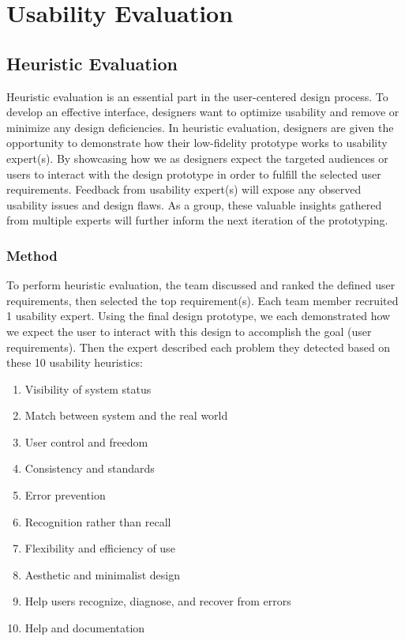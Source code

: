 \documentclass[acmsmall,screen,authorversion,nonacm]{acmart}
\begin{document}
\section{Usability Evaluation}

\subsection{Heuristic Evaluation}

Heuristic evaluation is an essential part in the user-centered design process. To develop an effective interface, designers want to optimize usability and remove or minimize any design deficiencies. In heuristic evaluation, designers are given the opportunity to demonstrate how their low-fidelity prototype works to usability expert(s). By showcasing how we as designers expect the targeted audiences or users to interact with the design prototype in order to fulfill the selected user requirements. Feedback from usability expert(s) will expose any observed usability issues and design flaws. As a group, these valuable insights gathered from multiple experts will further inform the next iteration of the prototyping. 

\subsubsection{Method}

To perform heuristic evaluation, the team discussed and ranked the defined user requirements, then selected the top requirement(s). Each team member recruited 1 usability expert. Using the final design prototype, we each demonstrated how we expect the user to interact with this design to accomplish the goal (user requirements). Then the expert described each problem they detected based on these 10 usability heuristics: 

\begin{enumerate}
    \item Visibility of system status
    \item Match between system and the real world
    \item User control and freedom
    \item Consistency and standards
    \item Error prevention
    \item Recognition rather than recall
    \item Flexibility and efficiency of use
    \item Aesthetic and minimalist design
    \item Help users recognize, diagnose, and recover from errors
    \item Help and documentation
\end{enumerate}
\end{document}
